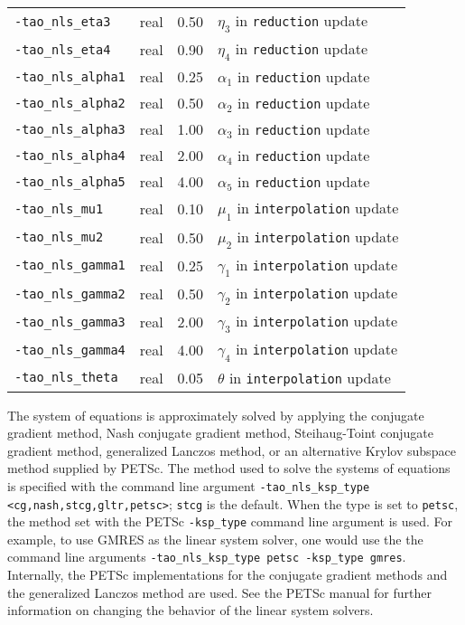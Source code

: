 \begin{table}[h]
\begin{tabular}{l|p{1.5in}|l|p{2.0in}}
{\tt -tao\_nls\_eta3} & real & 0.50 & $\eta_3$ in {\tt reduction} update \\
{\tt -tao\_nls\_eta4} & real & 0.90 & $\eta_4$ in {\tt reduction} update \\
{\tt -tao\_nls\_alpha1} & real & 0.25 & $\alpha_1$ in {\tt reduction} update \\
{\tt -tao\_nls\_alpha2} & real & 0.50 & $\alpha_2$ in {\tt reduction} update \\
{\tt -tao\_nls\_alpha3} & real & 1.00 & $\alpha_3$ in {\tt reduction} update \\
{\tt -tao\_nls\_alpha4} & real & 2.00 & $\alpha_4$ in {\tt reduction} update \\
{\tt -tao\_nls\_alpha5} & real & 4.00 & $\alpha_5$ in {\tt reduction} update \\
{\tt -tao\_nls\_mu1} & real & 0.10 & $\mu_1$ in {\tt interpolation} update \\
{\tt -tao\_nls\_mu2} & real & 0.50 & $\mu_2$ in {\tt interpolation} update \\
{\tt -tao\_nls\_gamma1} & real & 0.25 & $\gamma_1$ in {\tt interpolation} update \\
{\tt -tao\_nls\_gamma2} & real & 0.50 & $\gamma_2$ in {\tt interpolation} update \\
{\tt -tao\_nls\_gamma3} & real & 2.00 & $\gamma_3$ in {\tt interpolation} update \\
{\tt -tao\_nls\_gamma4} & real & 4.00 & $\gamma_4$ in {\tt interpolation} update \\
{\tt -tao\_nls\_theta} & real & 0.05 & $\theta$ in {\tt interpolation} update \\
\hline
\end{tabular}
\end{table}
\afterpage{\clearpage}

The system of equations is approximately solved by applying the conjugate 
gradient method, Nash conjugate gradient method, Steihaug-Toint conjugate 
gradient method, generalized 
Lanczos method, or an alternative Krylov subspace method 
supplied by PETSc.  The method used to solve the systems of equations is 
specified with the command line argument 
{\tt -tao\_nls\_ksp\_type <cg,nash,stcg,gltr,petsc>}; {\tt stcg} 
is the default.  When the type is set to {\tt petsc}, the method set with 
the PETSc {\tt -ksp\_type} command line argument is used.  For example, to 
use GMRES as the linear system solver, one would use the the command line 
arguments {\tt -tao\_nls\_ksp\_type petsc -ksp\_type gmres}.  Internally,
the PETSc implementations for the conjugate gradient methods and the 
generalized Lanczos method are used.  See the PETSc manual for further 
information on changing the behavior of the linear system solvers.  


